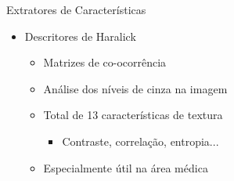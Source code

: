 \documentclass{beamer}
\begin{document}
\begin{frame}{Extratores de Características}
  \begin{itemize}
   \item Descritores de Haralick\newline
   \begin{itemize}
      \item Matrizes de co-ocorrência\newline
      \item Análise dos níveis de cinza na imagem\newline
      \item Total de 13 características de textura\newline
	\begin{itemize}
	    \item Contraste, correlação, entropia...\newline
	\end{itemize}
     \item Especialmente útil na área médica
   \end{itemize}
   
  \end{itemize}

\end{frame}
\end{document}
